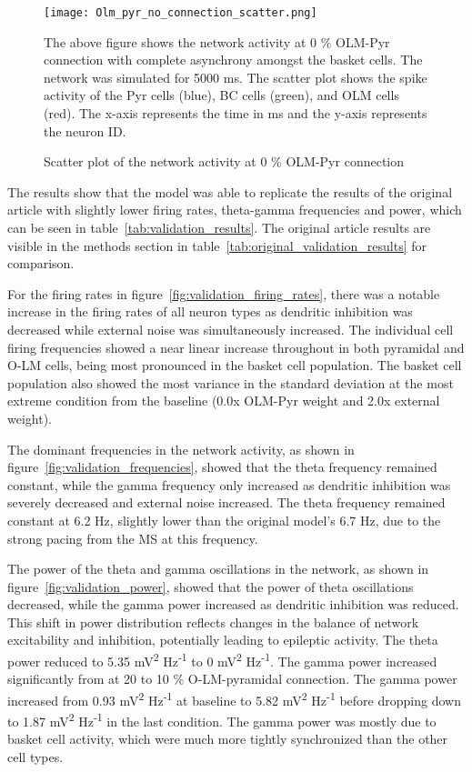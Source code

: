 \begin{figure}[htbp]
    \centering
    \texttt{[image: Olm\_pyr\_no\_connection\_scatter.png]}
    \caption[0 \% OLM-Pyr connection scatter plot]{Scatter plot of the network activity at 0 \% OLM-Pyr connection}\label{fig:scatterplot_0_con_olm_pyr}
    \begin{minipage}{0.9\textwidth}
        The above figure shows the network activity at 0 \% OLM-Pyr connection with complete asynchrony amongst the basket cells.
        The network was simulated for 5000 ms. 
        The scatter plot shows the spike activity of the Pyr cells (blue), BC cells (green), and OLM cells (red). 
        The x-axis represents the time in ms and the y-axis represents the neuron ID\@. 
    \end{minipage}
\end{figure}

The results show that the model was able to
replicate the results of the original article with slightly lower firing rates,
theta-gamma frequencies and power, which can be seen in
table~\ref{tab:validation_results}. The original article results are visible in
the methods section in table~\ref{tab:original_validation_results} for comparison.

For the firing rates in figure~\ref{fig:validation_firing_rates},
there was a notable increase in the firing rates of all neuron types as dendritic inhibition was 
decreased while external noise was simultaneously increased.
The individual cell firing frequencies showed a near linear increase throughout in both pyramidal and O-LM cells, 
being most pronounced in the basket cell population.
The basket cell population also showed the most variance in the standard deviation at the most extreme 
condition from the baseline (0.0x OLM-Pyr weight and 2.0x external weight).

The dominant frequencies in the network activity, as shown in figure~\ref{fig:validation_frequencies},
showed that the theta frequency remained constant, while the gamma frequency only increased as dendritic inhibition was severely decreased and external noise increased.
The theta frequency remained constant at 6.2 Hz, slightly lower than the original model's 6.7 Hz, due to the strong pacing from the MS at this frequency.

The power of the theta and gamma oscillations in the network, as shown in figure~\ref{fig:validation_power},
showed that the power of theta oscillations decreased, while the gamma power increased as dendritic inhibition was reduced.
This shift in power distribution reflects changes in the balance of network excitability and inhibition, potentially leading to epileptic activity.
The theta power reduced to 5.35 mV\textsuperscript{2} Hz\textsuperscript{-1} to 0 mV\textsuperscript{2} Hz\textsuperscript{-1}.
The gamma power increased significantly from at 20 to 10 \% O-LM-pyramidal connection. The gamma power increased from 0.93 mV\textsuperscript{2} Hz\textsuperscript{-1} 
at baseline to 5.82 mV\textsuperscript{2} Hz\textsuperscript{-1} before dropping down to 1.87 mV\textsuperscript{2} Hz\textsuperscript{-1} in the last condition.
The gamma power was mostly due to basket cell activity, which were much more tightly synchronized than the other cell types.


